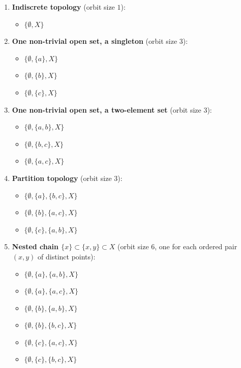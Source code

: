 \documentclass[12pt]{article}
\begin{document}
\begin{enumerate}
    \item \textbf{Indiscrete topology} (orbit size $1$):
    \begin{itemize}
        \item $\{\emptyset, X\}$
    \end{itemize}

    \item \textbf{One non-trivial open set, a singleton} (orbit size $3$):
    \begin{itemize}
        \item $\{\emptyset, \{a\}, X\}$
        \item $\{\emptyset, \{b\}, X\}$
        \item $\{\emptyset, \{c\}, X\}$
    \end{itemize}

    \item \textbf{One non-trivial open set, a two-element set} (orbit size $3$):
    \begin{itemize}
        \item $\{\emptyset, \{a,b\}, X\}$
        \item $\{\emptyset, \{b,c\}, X\}$
        \item $\{\emptyset, \{a,c\}, X\}$
    \end{itemize}

    \item \textbf{Partition topology} (orbit size $3$):
    \begin{itemize}
        \item $\{\emptyset, \{a\}, \{b,c\}, X\}$
        \item $\{\emptyset, \{b\}, \{a,c\}, X\}$
        \item $\{\emptyset, \{c\}, \{a,b\}, X\}$
    \end{itemize}

    \item \textbf{Nested chain $\{x\}\subset\{x,y\}\subset X$} (orbit size $6$, one for each ordered pair $(x,y)$ of distinct points):
    \begin{itemize}
        \item $\{\emptyset, \{a\}, \{a,b\}, X\}$
        \item $\{\emptyset, \{a\}, \{a,c\}, X\}$
        \item $\{\emptyset, \{b\}, \{a,b\}, X\}$
        \item $\{\emptyset, \{b\}, \{b,c\}, X\}$
        \item $\{\emptyset, \{c\}, \{a,c\}, X\}$
        \item $\{\emptyset, \{c\}, \{b,c\}, X\}$
    \end{itemize}


\end{enumerate}
\end{document}

